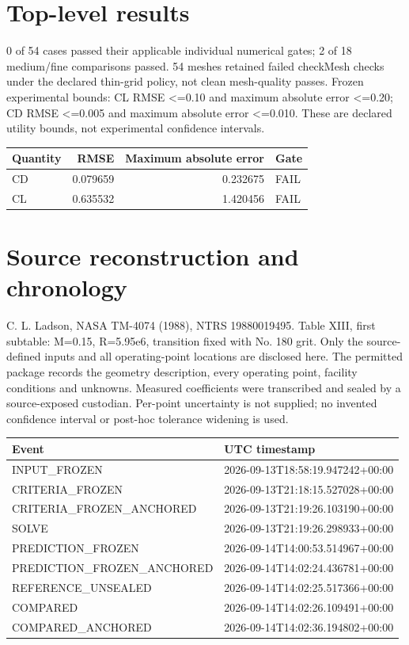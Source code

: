 \documentclass[10pt]{article}
\begin{document}
\section{Top-level results}
0 of 54 cases passed their applicable individual numerical gates; 2 of 18 medium/fine comparisons passed. 54 meshes retained failed checkMesh checks under the declared thin-grid policy, not clean mesh-quality passes.
Frozen experimental bounds: CL RMSE <=0.10 and maximum absolute error <=0.20; CD RMSE <=0.005 and maximum absolute error <=0.010. These are declared utility bounds, not experimental confidence intervals.
\par\medskip\noindent
\begin{tabular}{lrrl}\toprule Quantity & RMSE & Maximum absolute error & Gate\\\midrule
CD & 0.079659 & 0.232675 & FAIL\\
CL & 0.635532 & 1.420456 & FAIL\\
\bottomrule\end{tabular}
\clearpage\section{Source reconstruction and chronology}
C. L. Ladson, NASA TM-4074 (1988), NTRS 19880019495. Table XIII, first subtable: M=0.15, R=5.95e6, transition fixed with No. 180 grit. Only the source-defined inputs and all operating-point locations are disclosed here.
The permitted package records the geometry description, every operating point, facility conditions and unknowns. Measured coefficients were transcribed and sealed by a source-exposed custodian. Per-point uncertainty is not supplied; no invented confidence interval or post-hoc tolerance widening is used.
{\footnotesize\begin{longtable}{p{.42\linewidth}p{.54\linewidth}}\toprule Event & UTC timestamp\\\midrule
INPUT\_FROZEN & 2026-09-13T18:58:19.947242+00:00\\
CRITERIA\_FROZEN & 2026-09-13T21:18:15.527028+00:00\\
CRITERIA\_FROZEN\_ANCHORED & 2026-09-13T21:19:26.103190+00:00\\
SOLVE & 2026-09-13T21:19:26.298933+00:00\\
PREDICTION\_FROZEN & 2026-09-14T14:00:53.514967+00:00\\
PREDICTION\_FROZEN\_ANCHORED & 2026-09-14T14:02:24.436781+00:00\\
REFERENCE\_UNSEALED & 2026-09-14T14:02:25.517366+00:00\\
COMPARED & 2026-09-14T14:02:26.109491+00:00\\
COMPARED\_ANCHORED & 2026-09-14T14:02:36.194802+00:00\\
\bottomrule\end{longtable}}
\end{document}

